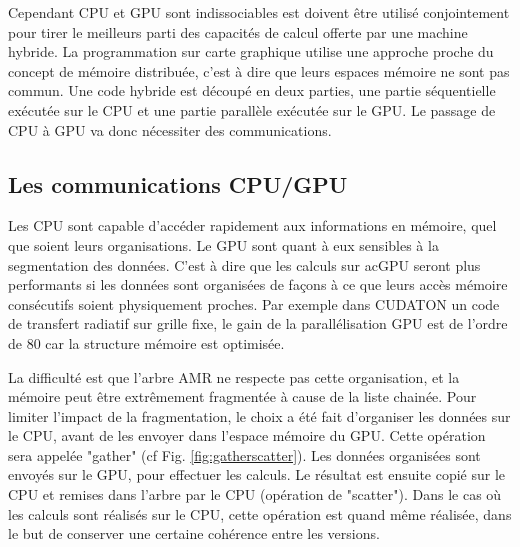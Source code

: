 Cependant \ac{CPU} et \ac{GPU} sont indissociables est doivent être utilisé conjointement pour tirer le meilleurs parti des capacités de calcul offerte par une machine hybride.
La programmation sur carte graphique utilise une approche proche du concept de mémoire distribuée, c'est à dire que leurs espaces mémoire ne sont pas commun.
Une code hybride est découpé en deux parties, une partie séquentielle exécutée sur le \ac{CPU} et une partie parallèle exécutée sur le \ac{GPU}.
Le passage de \ac{CPU} à \ac{GPU} va donc nécessiter des communications.





%
%
%
%


\subsection{Les communications CPU/GPU}
\label{sec:cpugpu}

Les \ac{CPU} sont capable d'accéder rapidement aux informations en mémoire, quel que soient leurs organisations.
Le \ac{GPU} sont quant à eux sensibles à la segmentation des données.
C'est à dire que les calculs sur ac{GPU} seront plus performants si les données sont organisées de façons à ce que leurs accès mémoire consécutifs soient physiquement proches.
Par exemple dans CUDATON \citep{aubert_radiative_2008} un code de transfert radiatif sur grille fixe, le gain de la parallélisation GPU est de l'ordre de 80 car la structure mémoire est optimisée.

La difficulté est que l'arbre \ac{AMR} ne respecte pas cette organisation, et la mémoire peut être extrêmement fragmentée à cause de la liste chainée.
Pour limiter l'impact de la fragmentation, le choix a été fait d'organiser les données sur le CPU, avant de les envoyer dans l'espace mémoire du GPU.
Cette opération sera appelée "gather" (cf Fig. \ref{fig:gatherscatter}).
Les données organisées sont envoyés sur le GPU, pour effectuer les calculs.
Le résultat est ensuite copié sur le CPU et remises dans l'arbre par le CPU (opération de "scatter").
Dans le cas où les calculs sont réalisés sur le CPU, cette opération est quand même réalisée, dans le but de conserver une certaine cohérence entre les versions.


